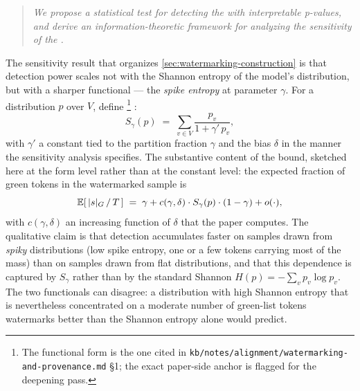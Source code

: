 \begin{quote}\itshape
We propose a statistical test for detecting the  with
interpretable p-values, and derive an information-theoretic framework
for analyzing the sensitivity of the .
\end{quote}

The sensitivity result that organizes \cref{sec:watermarking-construction}
is that detection power scales not with the Shannon entropy of the
model's distribution, but with a sharper functional --- the
\emph{spike entropy} at parameter $\gamma$. For a distribution
$p$ over $V$, define%
\footnote{The functional form is the one cited in
\texttt{kb/notes/alignment/watermarking-and-provenance.md} \S 1; the
exact paper-side anchor is flagged for the deepening pass.}
:
\[
S_\gamma(p) \;=\; \sum_{v \in V} \frac{p_v}{1 + \gamma' \, p_v},
\]
with $\gamma'$ a constant tied to the partition fraction $\gamma$ and
the bias $\delta$ in the manner the sensitivity analysis specifies. The
substantive content of the bound, sketched here at the form level
rather than at the constant level: the expected fraction of green
tokens in the watermarked sample is
\[
\operatorname{\mathbb{E}}[\,|s|_G \,/\, T\,] \;=\; \gamma + c(\gamma, \delta) \cdot S_\gamma(p) \cdot (1 - \gamma) + o(\cdot),
\]
with $c(\gamma, \delta)$ an increasing function of $\delta$ that the
paper computes. The qualitative claim is that detection accumulates
faster on samples drawn from \emph{spiky} distributions (low spike
entropy, one or a few tokens carrying most of the mass) than on
samples drawn from flat distributions, and that this dependence is
captured by $S_\gamma$ rather than by the standard Shannon
$H(p) = -\sum_v p_v \log p_v$. The two functionals can disagree: a
distribution with high Shannon entropy that is nevertheless
concentrated on a moderate number of green-list tokens watermarks
better than the Shannon entropy alone would predict.

